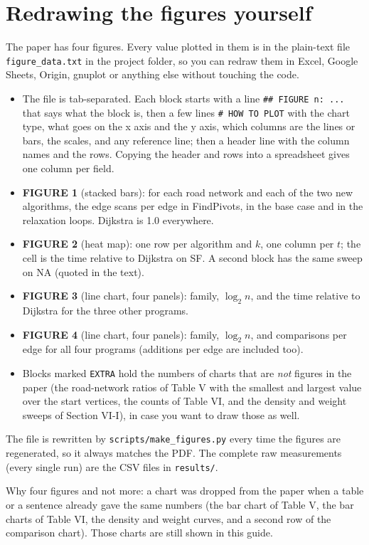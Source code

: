 \documentclass[11pt,a4paper]{article}
\newcommand{\code}[1]{\texttt{#1}}
\begin{document}
\section{Redrawing the figures yourself}\label{sec:figdata}
The paper has four figures. Every value plotted in them is in the plain-text file \code{figure\_data.txt} in the project folder, so you can redraw them in Excel, Google Sheets, Origin, gnuplot or anything else without touching the code.
\begin{itemize}
\item The file is tab-separated. Each block starts with a line \code{\#\# FIGURE n: ...} that says what the block is, then a few lines \code{\# HOW TO PLOT} with the chart type, what goes on the x axis and the y axis, which columns are the lines or bars, the scales, and any reference line; then a header line with the column names and the rows. Copying the header and rows into a spreadsheet gives one column per field.
\item \textbf{FIGURE 1} (stacked bars): for each road network and each of the two new algorithms, the edge scans per edge in FindPivots, in the base case and in the relaxation loops. Dijkstra is 1.0 everywhere.
\item \textbf{FIGURE 2} (heat map): one row per algorithm and $k$, one column per $t$; the cell is the time relative to Dijkstra on SF. A second block has the same sweep on NA (quoted in the text).
\item \textbf{FIGURE 3} (line chart, four panels): family, $\log_2 n$, and the time relative to Dijkstra for the three other programs.
\item \textbf{FIGURE 4} (line chart, four panels): family, $\log_2 n$, and comparisons per edge for all four programs (additions per edge are included too).
\item Blocks marked \code{EXTRA} hold the numbers of charts that are \emph{not} figures in the paper (the road-network ratios of Table V with the smallest and largest value over the start vertices, the counts of Table VI, and the density and weight sweeps of Section VI-I), in case you want to draw those as well.
\end{itemize}
The file is rewritten by \code{scripts/make\_figures.py} every time the figures are regenerated, so it always matches the PDF. The complete raw measurements (every single run) are the CSV files in \code{results/}.

Why four figures and not more: a chart was dropped from the paper when a table or a sentence already gave the same numbers (the bar chart of Table V, the bar charts of Table VI, the density and weight curves, and a second row of the comparison chart). Those charts are still shown in this guide.
\end{document}
